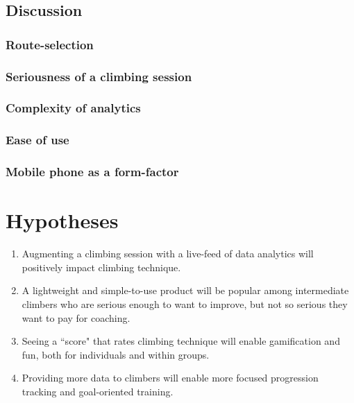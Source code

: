 \subsection{Discussion}

\subsubsection{Route-selection}

\subsubsection{Seriousness of a climbing session}   

\subsubsection{Complexity of analytics}

\subsubsection{Ease of use}


\subsubsection{Mobile phone as a form-factor} 





\section{Hypotheses}


\begin{enumerate}
    \item Augmenting a climbing session with a live-feed of data analytics will positively impact climbing technique.
    \item A lightweight and simple-to-use product will be popular among intermediate climbers who are serious enough to want to improve, but not so serious they want to pay for coaching.
    \item Seeing a ``score" that rates climbing technique will enable gamification and fun, both for individuals and within groups.
    \item Providing more data to climbers will enable more focused progression tracking and goal-oriented training.
\end{enumerate}
